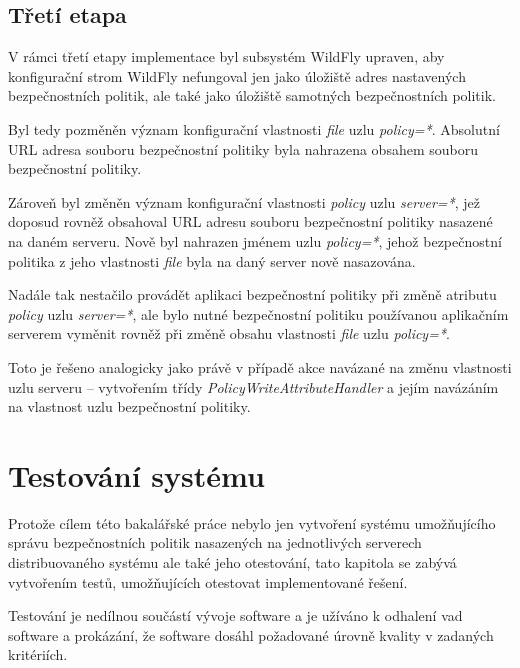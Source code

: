 \section{Třetí etapa}

V rámci třetí etapy implementace byl subsystém WildFly upraven, aby konfigurační strom WildFly nefungoval jen jako úložiště adres nastavených bezpečnostních politik, ale také jako úložiště samotných bezpečnostních politik.

Byl tedy pozměněn význam konfigurační vlastnosti {\it file} uzlu {\it policy=*}. Absolutní URL adresa souboru  bezpečnostní politiky byla nahrazena obsahem souboru bezpečnostní politiky.

Zároveň byl změněn význam konfigurační vlastnosti {\it policy} uzlu {\it server=*}, jež doposud rovněž obsahoval URL adresu souboru bezpečnostní politiky nasazené na daném serveru. Nově byl nahrazen jménem uzlu {\it policy=*}, jehož bezpečnostní politika z jeho vlastnosti {\it file} byla na daný server nově nasazována.

Nadále tak nestačilo provádět aplikaci bezpečnostní politiky při změně atributu {\it policy} uzlu {\it server=*}, ale bylo nutné bezpečnostní politiku používanou aplikačním serverem vyměnit rovněž při změně obsahu vlastnosti {\it file} uzlu {\it policy=*}.

Toto je řešeno analogicky jako právě v případě akce navázané na změnu vlastnosti uzlu serveru -- vytvořením třídy {\it PolicyWriteAttributeHandler} a jejím navázáním na vlastnost uzlu bezpečnostní politiky.

\chapter{Testování systému}

Protože cílem této bakalářské práce nebylo jen vytvoření systému umožňujícího správu bezpečnostních politik nasazených na jednotlivých serverech distribuovaného systému ale také jeho otestování, tato kapitola se zabývá vytvořením testů, umožňujících otestovat implementované řešení.

Testování je nedílnou součástí vývoje software a je užíváno k odhalení vad software a prokázání, že software dosáhl požadované úrovně kvality v zadaných kritériích. \cite{ivsTest}

